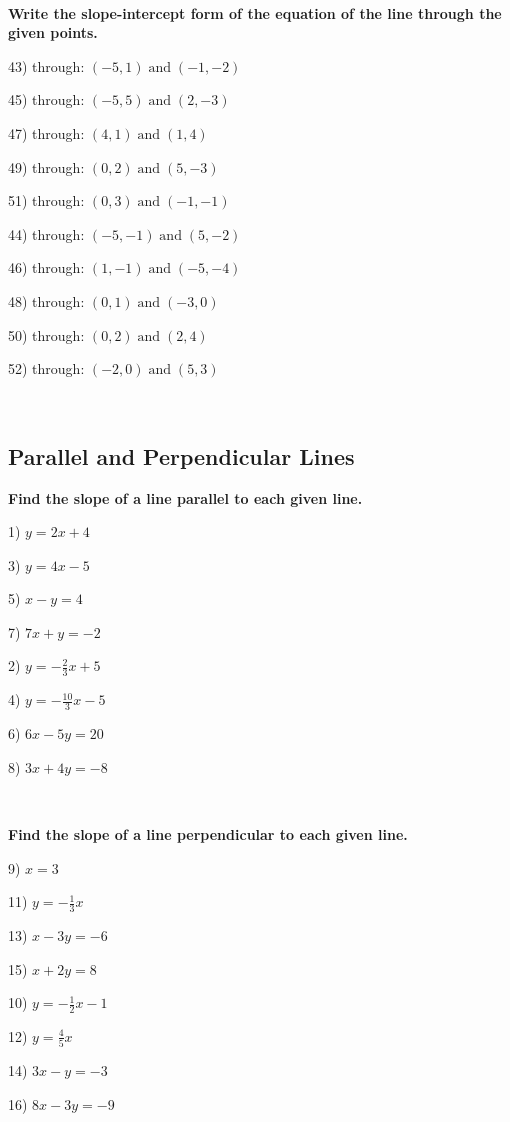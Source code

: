 \documentclass[11pt]{book}
\newcommand{\tmop}[1]{\ensuremath{\operatorname{#1}}}
\newcommand{\tmstrong}[1]{\textbf{#1}}
\theoremstyle{definition}  %
\begin{document}
\

{\tmstrong{Write the slope-intercept form of the equation of the line through
the given points.}}

\begin{multicols}{2}
  43) through: $(- 5, 1) \tmop{and} (- 1, - 2)$
  
  45) through: $(- 5, 5) \tmop{and} (2, - 3)$
  
  47) through: $(4, 1) \tmop{and} (1, 4)$
  
  49) through: $(0, 2) \tmop{and} (5, - 3)$
  
  51) through: $(0, 3) \tmop{and} (- 1, - 1)$
  
  44) through: $(- 5, - 1) \tmop{and} (5, - 2)$
  
  46) through: $(1, - 1) \tmop{and} (- 5, - 4)$
  
  48) through: $(0, 1) \tmop{and} (- 3, 0)$
  
  50) through: $(0, 2) \tmop{and} (2, 4)$
  
  52) through: $(- 2, 0) \tmop{and} (5, 3)$
\end{multicols}

\vspace{2in}
~

\pagebreak

\subsection{Parallel and Perpendicular Lines}\par

{\tmstrong{Find the slope of a line parallel to each given line.}}

\begin{multicols}{2}
  1) $y = 2 x + 4$
  
  3) $y = 4 x - 5$
  
  5) $x - y = 4$
  
  7) $7 x + y = - 2$
  
  2) $y = - \frac{2}{3} x + 5$
  
  4) $y = - \frac{10}{3} x - 5$
  
  6) $6 x - 5 y = 20$
  
  8) $3 x + 4 y = - 8$
\end{multicols}

\

{\tmstrong{Find the slope of a line perpendicular to each given line.}}

\begin{multicols}{2}
  9) $x = 3$
  
  11) $y = - \frac{1}{3} x$
  
  13) $x - 3 y = - 6$
  
  15) $x + 2 y = 8$
  
  10) $y = - \frac{1}{2} x - 1$
  
  12) $y = \frac{4}{5} x$
  
  14) $3 x - y = - 3$
  
  16) $8 x - 3 y = - 9$
\end{multicols}
\end{document}
